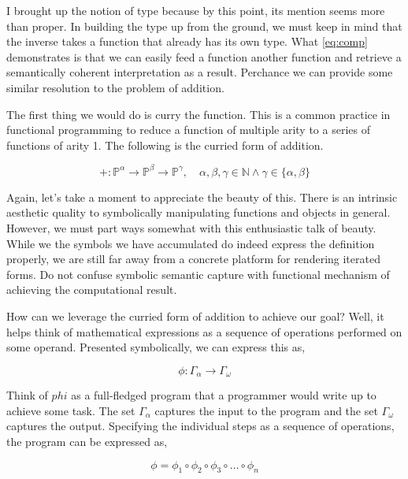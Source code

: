 \documentclass[12pt]{article}
\begin{document}
I brought up the notion of type because by this point, its mention seems more
than proper. In building the type up from the ground, we must keep in mind that
the inverse takes a function that already has its own type. What \ref{eq:comp}
demonstrates is that we can easily feed a function another function and
retrieve a semantically coherent interpretation as a result. Perchance we can
provide some similar resolution to the problem of addition.

The first thing we would do is curry the function. This is a common practice in
functional programming to reduce a function of multiple arity to a series of
functions of arity 1. The following is the curried form of addition.

\begin{equation}
    +: \mathbb{P}^\alpha \rightarrow \mathbb{P}^\beta \rightarrow \mathbb{P}^\gamma, \quad \alpha, \beta, \gamma \in \mathbb{N} \land \gamma \in \{\alpha, \beta\}
\end{equation}

Again, let's take a moment to appreciate the beauty of this. There is an
intrinsic aesthetic quality to symbolically manipulating functions and objects
in general. However, we must part ways somewhat with this enthusiastic talk of
beauty. While we the symbols we have accumulated do indeed express the
definition properly, we are still far away from a concrete platform for
rendering iterated forms. Do not confuse symbolic semantic capture with
functional mechanism of achieving the computational result.

How can we leverage the curried form of addition to achieve our goal? Well, it
helps think of mathematical expressions as a sequence of operations performed
on some operand. Presented symbolically, we can express this as,

\begin{equation}
    \phi: \Gamma_\alpha \rightarrow \Gamma_\omega
\end{equation}

Think of $phi$ as a full-fledged program that a programmer would write up to
achieve some task. The set $\Gamma_\alpha$ captures the input to the program
and the set $\Gamma_\omega$ captures the output. Specifying the individual
steps as a sequence of operations, the program can be expressed as,

\begin{equation}
    \phi = \phi_1 \circ \phi_2 \circ \phi_3 \circ \dots \circ \phi_n
\end{equation}
\end{document}

